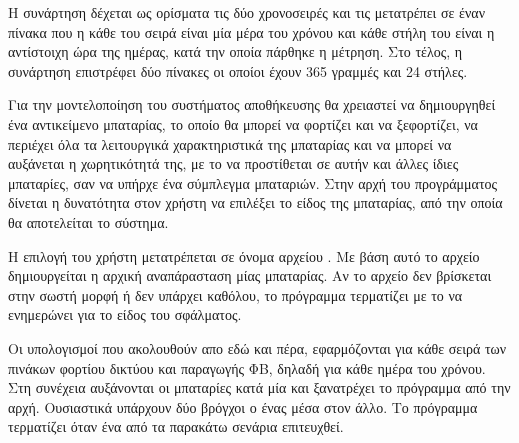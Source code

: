 \documentclass[12pt]{report}
\begin{document}
{{}

Η συνάρτηση {} δέχεται ως ορίσματα τις δύο χρονοσειρές και τις μετατρέπει σε έναν πίνακα που η κάθε του σειρά
είναι μία μέρα του χρόνου και κάθε στήλη του είναι η αντίστοιχη ώρα της ημέρας, κατά την οποία πάρθηκε η μέτρηση. 
Στο τέλος, η συνάρτηση επιστρέφει δύο πίνακες οι οποίοι έχουν 365 γραμμές και 24 στήλες.

Για την μοντελοποίηση του συστήματος αποθήκευσης θα χρειαστεί να δημιουργηθεί ένα αντικείμενο μπαταρίας, το οποίο θα 
μπορεί να φορτίζει και να ξεφορτίζει, να περιέχει όλα τα λειτουργικά χαρακτηριστικά της μπαταρίας και να μπορεί να αυξάνεται
η χωρητικότητά της, με το να προστίθεται σε αυτήν και άλλες ίδιες μπαταρίες, σαν να υπήρχε ένα σύμπλεγμα μπαταριών.
Στην αρχή του προγράμματος δίνεται η δυνατότητα στον χρήστη να επιλέξει το είδος της μπαταρίας, από την οποία θα αποτελείται το σύστημα.

{}

Η επιλογή του χρήστη μετατρέπεται σε όνομα αρχείου {}. Με βάση αυτό το αρχείο δημιουργείται η αρχική αναπάρασταση
μίας μπαταρίας. Αν το αρχείο δεν βρίσκεται στην σωστή μορφή ή δεν υπάρχει καθόλου, το πρόγραμμα τερματίζει με το να ενημερώνει για το
είδος του σφάλματος.

{}

Οι υπολογισμοί που ακολουθούν απο εδώ και πέρα, εφαρμόζονται για κάθε σειρά των πινάκων φορτίου δικτύου και παραγωγής ΦΒ,
δηλαδή για κάθε ημέρα του χρόνου. Στη συνέχεια αυξάνονται οι μπαταρίες κατά μία και ξανατρέχει το πρόγραμμα από την αρχή.
Ουσιαστικά υπάρχουν δύο βρόγχοι {} ο ένας μέσα στον άλλο.
Το πρόγραμμα τερματίζει όταν ένα από τα παρακάτω σενάρια επιτευχθεί.

}
\end{document}
